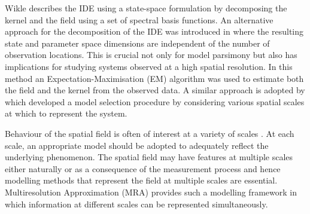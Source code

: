 \documentclass[11pt,draftcls,onecolumn,peerreview]{IEEEtran}
\begin{document}
Wikle \cite{Wikle2002} describes the IDE using a state-space formulation by decomposing the kernel and the field using a set of spectral basis functions. An alternative approach for the decomposition of the IDE was introduced in \cite{Dewar2009} where the resulting state and parameter space dimensions are independent of the number of observation locations. This is crucial not only for model parsimony but also has implications for studying systems observed at a high spatial resolution. In this method an Expectation-Maximisation (EM)  algorithm  was used to estimate both the field and the kernel from the observed data. A similar approach is adopted by \cite{Scerri2009} which developed a model selection procedure by considering various spatial scales at which to represent the system. %

Behaviour of the spatial field is often of interest at a variety of scales \cite{Wiens1989,Chelton1994,Schmidt2005,Ribba2006}. At each scale, an appropriate model should be adopted to adequately reflect the underlying phenomenon. The spatial field may have features at multiple scales either naturally or as a consequence of the measurement process \cite{Wilsky2002} and hence modelling methods that represent the field at multiple scales are essential. Multiresolution Approximation (MRA) \cite{Mallat1989a,Mallat1989b,Walnut2002} provides such a modelling framework in which information at different scales can be represented simultaneously.


\end{document}
